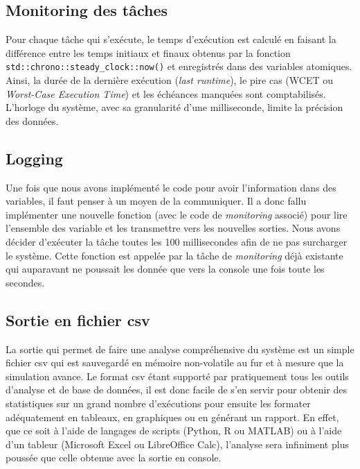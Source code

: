 \documentclass[journal]{IEEEtran}
\begin{document}
\subsection{Monitoring des tâches}

Pour chaque tâche qui s'exécute, le temps d'exécution est calculé en faisant la différence entre les temps initiaux et finaux obtenus par la fonction \verb|std::chrono::steady_clock::now()| et enregistrés dans des variables atomiques. Ainsi, la durée de la dernière exécution (\textit{last runtime}), le pire cas (WCET ou \textit{Worst-Case Execution Time}) et les échéances manquées sont comptabilisés. L'horloge du système, avec sa granularité d'une milliseconde, limite la précision des données.

\subsection{Logging}

Une fois que nous avons implémenté le code pour avoir l'information dans des variables, il faut penser à un moyen de la communiquer. Il a donc fallu implémenter une nouvelle fonction (avec le code de \textit{monitoring} associé) pour lire l'ensemble des variable et les transmettre vers les nouvelles sorties. Nous avons décider d'exécuter la tâche toutes les 100 millisecondes afin de ne pas surcharger le système. Cette fonction est appelée par la tâche de \textit{monitoring} déjà existante qui auparavant ne poussait les donnée que vers la console une fois toute les secondes.

\subsection{Sortie en fichier csv}

La sortie qui permet de faire une analyse compréhensive du système est un simple fichier csv qui est sauvegardé en mémoire non-volatile au fur et à mesure que la simulation avance. Le format csv étant supporté par pratiquement tous les outils d'analyse et de base de données, il est donc facile de s'en servir pour obtenir des statistiques sur un grand nombre d'exécutions pour ensuite les formater adéquatement en tableaux, en graphiques ou en générant un rapport. En effet, que ce soit à l'aide de langages de scripts (Python, R ou MATLAB) ou à l'aide d'un tableur (Microsoft Excel ou LibreOffice Calc), l'analyse sera infiniment plus poussée que celle obtenue avec la sortie en console.
 
\end{document}
